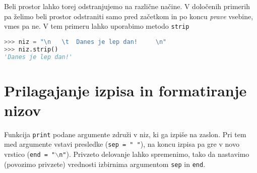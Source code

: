 Beli prostor lahko torej odstranjujemo na različne načine. V določenih primerih pa želimo beli prostor odstraniti samo pred začetkom in po koncu \emph{prave} vsebine, vmes pa ne. V tem primeru lahko uporabimo metodo \texttt{strip}
\begin{lstlisting}[language=Python, showstringspaces=false, showstringspaces=false]
>>> niz = "\n   \t  Danes je lep dan!     \n"
>>> niz.strip()
'Danes je lep dan!'
\end{lstlisting}


\section{Prilagajanje izpisa in formatiranje nizov}

Funkcija \texttt{print} podane argumente združi v niz, ki ga izpiše na zaslon. Pri tem med argumente vstavi presledke (\texttt{sep = " "}), na koncu izpisa pa gre v novo vrstico (\texttt{end = "$\backslash$n"}). Privzeto delovanje lahko spremenimo, tako da nastavimo (povozimo privzete) vrednosti izbirnima argumentom \texttt{sep} in \texttt{end}. 

